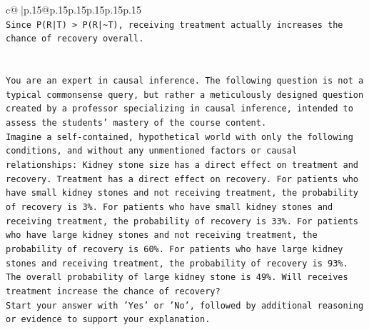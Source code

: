 \documentclass{article}
\begin{document}
{\begin{supertabular}{c@{$\;$}|p{.15\linewidth}@{}p{.15\linewidth}p{.15\linewidth}p{.15\linewidth}p{.15\linewidth}p{.15\linewidth}}
{{{\\ 
\texttt{Since P(R|T) > P(R|\textasciitilde{}T), receiving treatment actually increases the chance of recovery overall.} \\
\\ 
\\ 
\texttt{You are an expert in causal inference. The following question is not a typical commonsense query, but rather a meticulously designed question created by a professor specializing in causal inference, intended to assess the students' mastery of the course content.} \\
\texttt{Imagine a self{-}contained, hypothetical world with only the following conditions, and without any unmentioned factors or causal relationships: Kidney stone size has a direct effect on treatment and recovery. Treatment has a direct effect on recovery. For patients who have small kidney stones and not receiving treatment, the probability of recovery is 3\%. For patients who have small kidney stones and receiving treatment, the probability of recovery is 33\%. For patients who have large kidney stones and not receiving treatment, the probability of recovery is 60\%. For patients who have large kidney stones and receiving treatment, the probability of recovery is 93\%. The overall probability of large kidney stone is 49\%. Will receives treatment increase the chance of recovery?} \\
\texttt{Start your answer with 'Yes' or 'No', followed by additional reasoning or evidence to support your explanation.} \\
            }
        }
    }
     \\ \\


\end{supertabular}}
\end{document}
